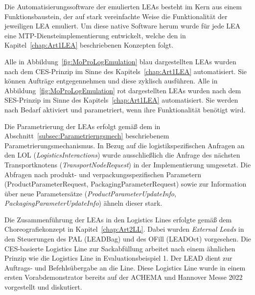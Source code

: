 Die Automatisierungssoftware der emulierten LEAs besteht im Kern aus einem Funktionsbaustein, der auf stark vereinfachte Weise die Funktionalität der jeweiligen LEA emuliert. Um diese native Software herum wurde für jede LEA eine MTP-Diensteimplementierung entwickelt, welche den in Kapitel~\ref{chap:Art1LEA} beschriebenen Konzepten folgt. 

Alle in Abbildung~\ref{fig:MoProLogEmulation} blau dargestellten LEAs wurden nach dem CES-Prinzip im Sinne des Kapitels~\ref{chap:Art1LEA} automatisiert. Sie können Aufträge entgegennehmen und diese zyklisch ausführen. Alle in Abbildung~\ref{fig:MoProLogEmulation} rot dargestellten LEAs wurden nach dem SES-Prinzip im Sinne des Kapitels~\ref{chap:Art1LEA} automatisiert. Sie werden nach Bedarf aktiviert und parametriert, wenn ihre Funktionalität benötigt wird. 

Die Parametrierung der LEAs erfolgt gemäß dem in Abschnitt~\ref{subsec:Parametrierngsmech} beschriebenem Parametrierungsmechanismus. In Bezug auf die logistikspezifischen Anfragen an den LOL (\emph{LogisticsInteractions}) wurde ausschließlich die Anfrage des nächsten Transportknotens (\emph{TransportNodeRequest}) in der Implementierung umgesetzt. Die Abfragen nach produkt- und verpackungsspezifischen Parametern (ProductParameterRequest, PackagingParameterRequest) sowie zur Information über neue Parametersätze (\emph{ProductParameterUpdateInfo}, \emph{PackagingParameterUpdateInfo}) ähneln dieser stark.

Die Zusammenführung der LEAs in den Logistics Lines erfolgte gemäß dem Choreografiekonzept in Kapitel~\ref{chap:Art2LL}. Dabei wurden \emph{External Leads} in den Steuerungen des PAL (LEADBag) und des OFill (LEADOct) vorgesehen. Die CES-basierte Logistics Line zur Sackabfüllung arbeitet nach einem ähnlichen Prinzip wie die Logistics Line in Evaluationsbeispiel 1. Der LEAD dient zur Auftrags- und Befehlsübergabe an die Line. Diese Logistics Line wurde in einem ersten Vorabdemonstrator bereits auf der ACHEMA und Hannover Messe 2022 vorgestellt und diskutiert.

